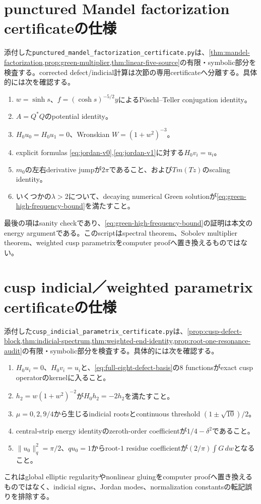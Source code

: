 \documentclass[11pt,a4paper]{ltjsarticle}
\theoremstyle{definition}
\theoremstyle{remark}
\begin{document}
\section{punctured Mandel factorization certificateの仕様}

添付した\texttt{punctured\_mandel\_factorization\_certificate.py}は、\cref{thm:mandel-factorization,prop:green-multiplier,thm:linear-five-source}の有限・symbolic部分を検査する。corrected defect/indicial計算は次節の専用certificateへ分離する。具体的には次を確認する。
\begin{enumerate}[leftmargin=2.5em]
\item $w=\sinh s$、$f=(\cosh s)^{-5/2}y$によるPöschl--Teller conjugation identity。
\item $A=Q^*Q$のpotential identity。
\item $H_0u_0=H_0u_1=0$、Wronskian $W=(1+w^2)^{-3}$。
\item explicit formulas \eqref{eq:jordan-v0},\eqref{eq:jordan-v1}に対する$H_0v_i=u_i$。
\item $m_0$の左右derivative jumpが$2\pi$であること、および$T m(Tz)$のscaling identity。
\item いくつかの$\lambda>2$について、decaying numerical Green solutionが\eqref{eq:green-high-frequency-bound}を満たすこと。
\end{enumerate}
最後の項はsanity checkであり、\eqref{eq:green-high-frequency-bound}の証明は本文のenergy argumentである。このscriptはspectral theorem、Sobolev multiplier theorem、weighted cusp parametrixをcomputer proofへ置き換えるものではない。

\section{cusp indicial／weighted parametrix certificateの仕様}

添付した\texttt{cusp\_indicial\_parametrix\_certificate.py}は、\cref{prop:cusp-defect-block,thm:indicial-spectrum,thm:weighted-end-identity,prop:root-one-resonance-audit}の有限・symbolic部分を検査する。具体的には次を確認する。
\begin{enumerate}[leftmargin=2.5em]
\item $H_0u_i=0$、$H_0v_i=u_i$と、\eqref{eq:full-eight-defect-basis}の8 functionsがexact cusp operatorのkernelに入ること。
\item $h_2=w(1+w^2)^{-2}$が$H_0h_2=-2h_2$を満たすこと。
\item $\mu=0,2,9/4$から生じるindicial rootsとcontinuous threshold $(1\pm\sqrt{10})/2$。
\item central-strip energy identityのzeroth-order coefficientが$1/4-\delta^2$であること。
\item $\|u_0\|_q^2=\pi/2$、$qu_0=1$からroot-$1$ residue coefficientが$(2/\pi)\int G\,dw$となること。
\end{enumerate}
これはglobal elliptic regularityやnonlinear gluingをcomputer proofへ置き換えるものではなく、indicial signs、Jordan modes、normalization constantsの転記誤りを排除する。
\end{document}
